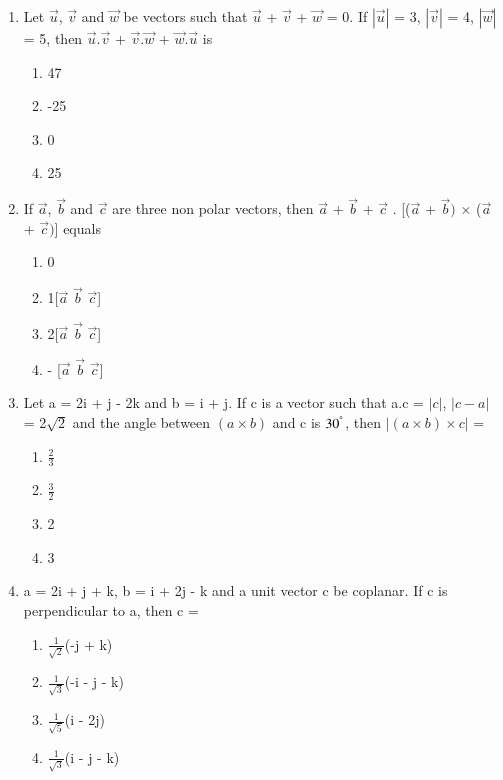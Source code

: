 \begin{enumerate}[label=\arabic*.,ref=\thesubsection.\theenumi]
\item Let $\overrightarrow{u}$, $\overrightarrow{v}$ and $\overrightarrow{w}$ be vectors such that $\overrightarrow{u}$ + $\overrightarrow{v}$ + $\overrightarrow{w}$ = 0. If $|\overrightarrow{u}|$ = 3, $|\overrightarrow{v}|$ = 4, $|\overrightarrow{w}|$ = 5, then $\overrightarrow{u}.\overrightarrow{v}$  + $\overrightarrow{v}.\overrightarrow{w}$ + $\overrightarrow{w}.\overrightarrow{u}$ is
\begin{enumerate}
\item 47
\item -25
\item 0
\item 25
\end{enumerate}

\item If $\overrightarrow{a}$, $\overrightarrow{b}$ and $\overrightarrow{c}$ are three non polar vectors, then $\overrightarrow{a}$ + $\overrightarrow{b}$ + $\overrightarrow{c}$ . [($\overrightarrow{a}$ + $\overrightarrow{b})$ $\times$ ($\overrightarrow{a}$ + $\overrightarrow{c})$] equals
\begin{enumerate}
\item 0
\item 1[$\overrightarrow{a}$  $\overrightarrow{b}$  $\overrightarrow{c}$]
\item 2[$\overrightarrow{a}$  $\overrightarrow{b}$  $\overrightarrow{c}$]
\item - [$\overrightarrow{a}$  $\overrightarrow{b}$  $\overrightarrow{c}$]
\end{enumerate}

\item Let a = 2i + j - 2k and b = i + j. If c is a vector such that a.c = $|c|$, $|c - a|$ = 2$\sqrt{2}$ and the angle between $(a \times b)$ and c is $30^{\degree}$, then $| (a \times b) \times c| $ = 
\begin{enumerate}
\item $\frac{2}{3}$
\item $\frac{3}{2}$
\item 2
\item 3
\end{enumerate}

\item a = 2i + j + k, b = i + 2j - k and a unit vector c be coplanar. If c is perpendicular to a, then c = 
\begin{enumerate}
\item $\frac{1}{\sqrt{2}}$(-j + k)
\item $\frac{1}{\sqrt{3}}$(-i - j - k)
\item $\frac{1}{\sqrt{5}}$(i - 2j)
\item $\frac{1}{\sqrt{3}}$(i - j - k)
\end{enumerate}


\end{enumerate}
